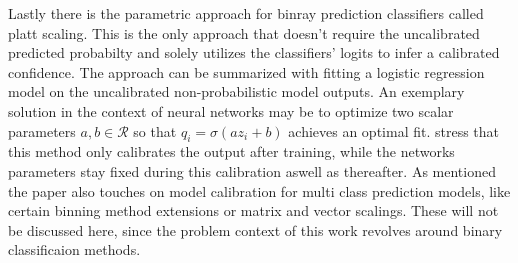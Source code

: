 Lastly there is the parametric approach for binray prediction classifiers called platt scaling. This is the only approach that doesn't require the uncalibrated predicted probabilty and solely utilizes 
the classifiers' logits to infer a calibrated confidence. The approach can be summarized with fitting a logistic regression model on the uncalibrated non-probabilistic model outputs. An exemplary 
solution in the context of neural networks may be to optimize two scalar parameters $a, b \in \mathcal{R}$ so that $\hat{q}_i = \sigma(az_i + b)$ achieves an optimal fit. \cite{Guo_2017_tempscalingetc} 
stress that this method only calibrates the output after training, while the networks parameters stay fixed during this calibration aswell as thereafter.
\newline
As mentioned the paper also touches on model calibration for multi class prediction models, like certain binning method extensions or matrix and vector scalings. These will not be discussed here, 
since the problem context of this work revolves around binary classificaion methods.


